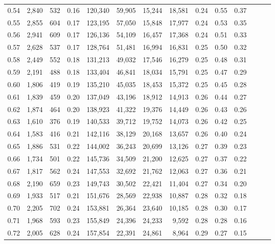 \begin{tabular}{rrrrrrrrrrrrrr}
0.54 &  2,840 &  532 &  0.16 &  120,340 &   59,905 &  15,244 &  18,581 &  0.24 &  0.55 &      0.37 \\
0.55 &  2,855 &  604 &  0.17 &  123,195 &   57,050 &  15,848 &  17,977 &  0.24 &  0.53 &      0.35 \\
0.56 &  2,941 &  609 &  0.17 &  126,136 &   54,109 &  16,457 &  17,368 &  0.24 &  0.51 &      0.33 \\
0.57 &  2,628 &  537 &  0.17 &  128,764 &   51,481 &  16,994 &  16,831 &  0.25 &  0.50 &      0.32 \\
0.58 &  2,449 &  552 &  0.18 &  131,213 &   49,032 &  17,546 &  16,279 &  0.25 &  0.48 &      0.31 \\
0.59 &  2,191 &  488 &  0.18 &  133,404 &   46,841 &  18,034 &  15,791 &  0.25 &  0.47 &      0.29 \\
0.60 &  1,806 &  419 &  0.19 &  135,210 &   45,035 &  18,453 &  15,372 &  0.25 &  0.45 &      0.28 \\
0.61 &  1,839 &  459 &  0.20 &  137,049 &   43,196 &  18,912 &  14,913 &  0.26 &  0.44 &      0.27 \\
0.62 &  1,874 &  464 &  0.20 &  138,923 &   41,322 &  19,376 &  14,449 &  0.26 &  0.43 &      0.26 \\
0.63 &  1,610 &  376 &  0.19 &  140,533 &   39,712 &  19,752 &  14,073 &  0.26 &  0.42 &      0.25 \\
0.64 &  1,583 &  416 &  0.21 &  142,116 &   38,129 &  20,168 &  13,657 &  0.26 &  0.40 &      0.24 \\
0.65 &  1,886 &  531 &  0.22 &  144,002 &   36,243 &  20,699 &  13,126 &  0.27 &  0.39 &      0.23 \\
0.66 &  1,734 &  501 &  0.22 &  145,736 &   34,509 &  21,200 &  12,625 &  0.27 &  0.37 &      0.22 \\
0.67 &  1,817 &  562 &  0.24 &  147,553 &   32,692 &  21,762 &  12,063 &  0.27 &  0.36 &      0.21 \\
0.68 &  2,190 &  659 &  0.23 &  149,743 &   30,502 &  22,421 &  11,404 &  0.27 &  0.34 &      0.20 \\
0.69 &  1,933 &  517 &  0.21 &  151,676 &   28,569 &  22,938 &  10,887 &  0.28 &  0.32 &      0.18 \\
0.70 &  2,205 &  702 &  0.24 &  153,881 &   26,364 &  23,640 &  10,185 &  0.28 &  0.30 &      0.17 \\
0.71 &  1,968 &  593 &  0.23 &  155,849 &   24,396 &  24,233 &   9,592 &  0.28 &  0.28 &      0.16 \\
0.72 &  2,005 &  628 &  0.24 &  157,854 &   22,391 &  24,861 &   8,964 &  0.29 &  0.27 &      0.15 \\

\end{tabular}
